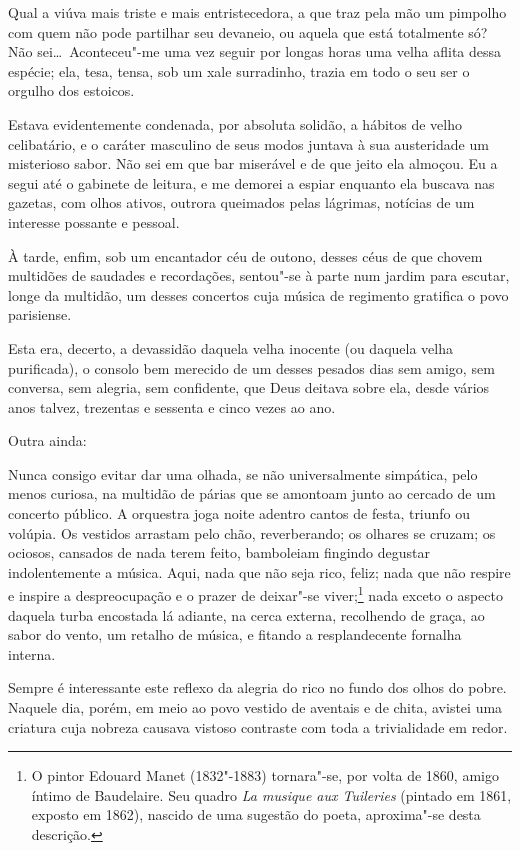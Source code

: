 Qual a viúva mais triste e mais entristecedora, a que traz pela mão
um pimpolho com quem não pode partilhar seu devaneio, ou aquela que
está totalmente só? Não sei\ldots\  Aconteceu"-me uma vez seguir por
longas horas uma velha aflita dessa espécie; ela, tesa, tensa, sob um
xale surradinho, trazia em todo o seu ser o orgulho dos estoicos.

Estava evidentemente condenada, por absoluta solidão, a hábitos
de velho celibatário, e o caráter masculino de seus modos 
juntava à sua austeridade um misterioso sabor. Não sei em que
bar miserável e de que jeito ela almoçou. Eu a segui até o gabinete de
leitura, e me demorei a espiar enquanto ela buscava nas gazetas,
com olhos ativos, outrora queimados pelas lágrimas, notícias de um
interesse possante e pessoal.

À tarde, enfim, sob um encantador céu de outono, desses céus de que chovem multidões de saudades e recordações, sentou"-se à parte num
jardim para escutar, longe da multidão, um desses concertos cuja
música de regimento gratifica o povo parisiense.

Esta era, decerto, a devassidão daquela velha inocente (ou daquela velha
purificada), o consolo bem merecido de um desses pesados dias sem
amigo, sem conversa, sem alegria, sem confidente, que Deus deitava 
sobre ela, desde vários anos talvez, trezentas e sessenta e cinco vezes ao ano.

Outra ainda:

Nunca consigo evitar dar uma olhada, se não universalmente simpática,
pelo menos curiosa, na multidão de párias que se amontoam junto ao
cercado de um concerto público. A orquestra joga noite adentro cantos de festa, triunfo ou volúpia. Os vestidos arrastam pelo chão, reverberando; os
olhares se cruzam; os ociosos, cansados de nada terem feito, bamboleiam fingindo degustar indolentemente a música. Aqui, nada que
não seja rico, feliz; nada que não respire e inspire a despreocupação e o
prazer de deixar"-se viver;\protect\footnote{ O pintor Edouard Manet (1832"-1883) tornara"-se, por volta de 1860,
amigo íntimo de Baudelaire. Seu quadro \textit{La musique aux Tuileries}
(pintado em 1861, exposto em 1862), nascido de uma sugestão do poeta,
aproxima"-se desta descrição.} nada exceto o aspecto
daquela turba encostada lá adiante, na cerca externa, recolhendo de graça,
ao sabor do vento, um retalho de música, e fitando a resplandecente
fornalha interna.

Sempre é interessante este reflexo da alegria do rico no fundo dos
olhos do pobre. Naquele dia, porém, em meio ao povo vestido de aventais
e de chita, avistei uma criatura cuja nobreza causava vistoso contraste com
toda a trivialidade em redor.

